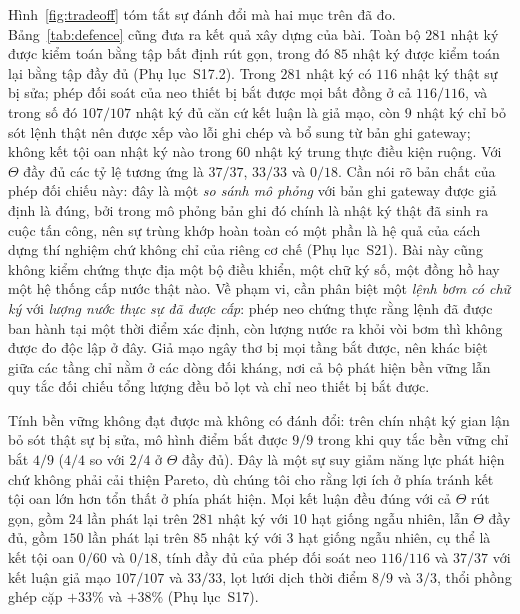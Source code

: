 Hình~\ref{fig:tradeoff} tóm tắt sự đánh đổi mà hai mục trên đã đo. Bảng~\ref{tab:defence} cũng đưa ra kết quả xây dựng của bài. Toàn bộ $281$ nhật ký được
kiểm toán bằng tập bất định rút gọn, trong đó $85$ nhật ký được kiểm toán lại bằng tập
đầy đủ (Phụ lục~S17.2). Trong $281$ nhật ký có $116$ nhật ký thật sự bị sửa; phép đối soát của neo thiết bị
bắt được mọi bất đồng ở cả $116/116$, và trong số đó $107/107$ nhật ký đủ căn cứ kết
luận là giả mạo, còn $9$ nhật ký chỉ bỏ sót lệnh thật nên được xếp vào lỗi ghi chép và
bổ sung từ bản ghi gateway; không kết tội oan nhật ký nào trong $60$ nhật ký trung thực
điều kiện ruộng.  Với $\Theta$ đầy đủ các tỷ lệ tương ứng là $37/37$, $33/33$ và $0/18$.
Cần nói rõ bản chất của phép đối chiếu này: đây là một \emph{so sánh mô phỏng} với
bản ghi gateway được giả định là đúng, bởi trong mô phỏng bản ghi đó chính là nhật
ký thật đã sinh ra cuộc tấn công, nên sự trùng khớp hoàn toàn có một phần là hệ quả
của cách dựng thí nghiệm chứ không chỉ của riêng cơ chế (Phụ lục~S21). Bài này cũng
không kiểm chứng thực địa một bộ điều khiển, một chữ ký số, một đồng hồ hay một hệ
thống cấp nước thật nào. Về phạm vi, cần phân biệt một \emph{lệnh bơm có chữ ký}
với \emph{lượng nước thực sự đã được cấp}: phép neo chứng thực rằng lệnh đã được
ban hành tại một thời điểm xác định, còn lượng nước ra khỏi vòi bơm thì không được
đo độc lập ở đây. Giả mạo ngây thơ bị mọi tầng bắt được,
nên khác biệt giữa các tầng chỉ nằm ở các dòng đối kháng, nơi cả bộ phát hiện bền vững lẫn
quy tắc đối chiếu tổng lượng đều bỏ lọt và chỉ neo thiết bị bắt được.

Tính bền vững không đạt được mà không có đánh đổi: trên chín nhật ký gian lận bỏ sót
thật sự bị sửa, mô hình điểm bắt được $9/9$ trong khi quy tắc bền vững chỉ bắt $4/9$
($4/4$ so với $2/4$ ở $\Theta$ đầy đủ). Đây là một sự suy giảm năng lực phát hiện chứ
không phải cải thiện Pareto, dù chúng tôi cho rằng lợi ích ở phía tránh kết tội oan lớn
hơn tổn thất ở phía phát hiện. Mọi kết luận đều đúng với cả $\Theta$ rút gọn, gồm $24$
lần phát lại trên $281$ nhật ký với $10$ hạt giống ngẫu nhiên, lẫn $\Theta$ đầy đủ, gồm
$150$ lần phát lại trên $85$ nhật ký với $3$ hạt giống ngẫu nhiên, cụ thể là kết tội oan
$0/60$ và $0/18$, tính đầy đủ của phép đối soát neo $116/116$ và $37/37$ với kết luận
giả mạo $107/107$ và $33/33$, lọt lưới dịch thời điểm $8/9$
và $3/3$, thổi phồng ghép cặp $+33\%$ và $+38\%$ (Phụ lục~S17).